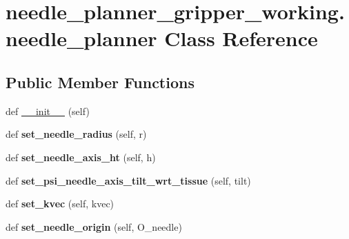 \hypertarget{classneedle__planner__gripper__working_1_1needle__planner}{}\section{needle\+\_\+planner\+\_\+gripper\+\_\+working.\+needle\+\_\+planner Class Reference}
\label{classneedle__planner__gripper__working_1_1needle__planner}
\subsection*{Public Member Functions}
\begin{DoxyCompactItemize}
\item 
def \hyperlink{classneedle__planner__gripper__working_1_1needle__planner_a8bef6d9d681dd6730cb44e114c3d9e74}{\+\_\+\+\_\+init\+\_\+\+\_\+} (self)
\item 
def {\bfseries set\+\_\+needle\+\_\+radius} (self, r)\hypertarget{classneedle__planner__gripper__working_1_1needle__planner_aafadda9de67e0900e0598cf20b277535}{}\label{classneedle__planner__gripper__working_1_1needle__planner_aafadda9de67e0900e0598cf20b277535}

\item 
def {\bfseries set\+\_\+needle\+\_\+axis\+\_\+ht} (self, h)\hypertarget{classneedle__planner__gripper__working_1_1needle__planner_a2f4c3843dc1f276e6b9206f13cc70281}{}\label{classneedle__planner__gripper__working_1_1needle__planner_a2f4c3843dc1f276e6b9206f13cc70281}

\item 
def {\bfseries set\+\_\+psi\+\_\+needle\+\_\+axis\+\_\+tilt\+\_\+wrt\+\_\+tissue} (self, tilt)\hypertarget{classneedle__planner__gripper__working_1_1needle__planner_a9bc242002e61d4fb6635da8db10b9bae}{}\label{classneedle__planner__gripper__working_1_1needle__planner_a9bc242002e61d4fb6635da8db10b9bae}

\item 
def {\bfseries set\+\_\+kvec} (self, kvec)\hypertarget{classneedle__planner__gripper__working_1_1needle__planner_a708df33483afd7eee57b80934edb3046}{}\label{classneedle__planner__gripper__working_1_1needle__planner_a708df33483afd7eee57b80934edb3046}

\item 
def {\bfseries set\+\_\+needle\+\_\+origin} (self, O\+\_\+needle)\hypertarget{classneedle__planner__gripper__working_1_1needle__planner_a1756c6b8021164335207b1883f4b843b}{}\label{classneedle__planner__gripper__working_1_1needle__planner_a1756c6b8021164335207b1883f4b843b}


\end{DoxyCompactItemize}
